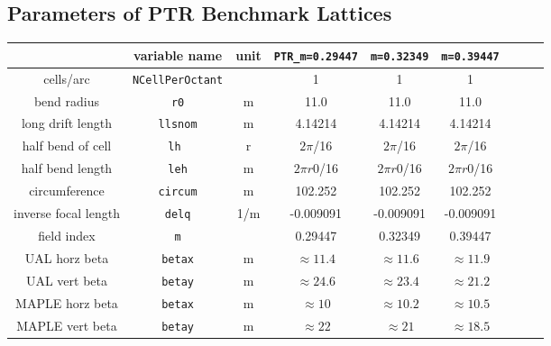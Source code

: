 \documentclass[]{article}
\begin{document}
\subsection{Parameters of PTR Benchmark Lattices}  
%
\begin{table}[h]
\centering
\begin{tabular}{|c|c|c|c|c|c|c|c|c|}        \hline
                        & variable name         & unit & {\tt  PTR\_m=0.29447} & {\tt m=0.32349} & {\tt m=0.39447} \\ \hline
cells/arc         & {\tt NCellPerOctant} &        &       1                              &       1                    &        1                   \\
bend radius       &  {\tt r0}                 &  m   &     11.0                           &      11.0                &       11.0               \\
long drift length &  {\tt llsnom}         &  m   &         4.14214                  &     4.14214           &    4.14214            \\
half bend of cell & {\tt lh }                &  r    &         $2\pi$/16                  &      $2\pi$/16        &       $2\pi$/16        \\
half bend length  & {\tt leh}            &  m   &          $2\pi r0$/16             &    $2\pi r0$/16      &       $2\pi r0$/16     \\
circumference     & {\tt circum}      &  m   &         102.252                   &         102.252       &   102.252          \\ \hline
inverse focal length &  {\tt delq}     & 1/m  &     -0.009091                   &       -0.009091       &     -0.009091       \\
field index       &  {\tt m}                 &          &              0.29447             &       0.32349         &      0.39447          \\ \hline
UAL horz beta  & {\tt betax}          &  m    &     $\approx 11.4$           &   $\approx 11.6$  &  $\approx 11.9$    \\
UAL vert beta     & {\tt betay}        &  m    &     $\approx 24.6$           &   $\approx 23.4$  &  $\approx 21.2$    \\ \hline
MAPLE horz beta  & {\tt betax}       &  m    &     $\approx 10$           &   $\approx  10.2$  &  $\approx 10.5$    \\
MAPLE vert beta     & {\tt betay}     &  m    &     $\approx 22$           &   $\approx 21 $  &  $\approx 18.5 $    \\ \hline

\end{tabular}
\end{table}
\end{document}
